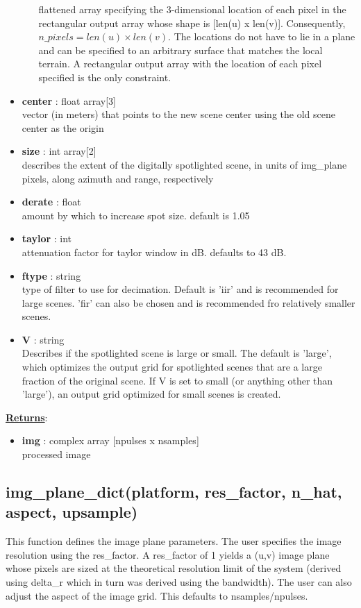 \documentclass{article}
\newcommand{\defs}[2]{\textbf{{#1}} : {#2}}
\begin{document}
\begin{itemize}
\begin{itemize}
	    	flattened array specifying the 3-dimensional location of each pixel in the rectangular output array whose shape is [len(u) x len(v)].  Consequently, $n\_pixels = len(u) \times len(v)$.  The locations do not have to lie in a plane and can be specified to an arbitrary surface that matches the local terrain.  A rectangular output array with the location of each pixel specified is the only constraint.
	\end{itemize}
	\item\defs{center}{float array[3]}\\
	vector (in meters) that points to the new scene center using the old scene center as the origin
	\item\defs{size}{int array[2]}\\
	describes the extent of the digitally spotlighted scene, in units of img\_plane pixels, along azimuth and range, respectively
	\item\defs{derate}{float}\\
	amount by which to increase spot size. default is 1.05
	\item\defs{taylor}{int}\\
	attenuation factor for taylor window in dB.  defaults to 43 dB.
	\item\defs{ftype}{string}\\
	type of filter to use for decimation.  Default is 'iir' and is recommended for large scenes.  'fir' can also be chosen and is recommended fro relatively smaller scenes.
	\item\defs{V}{string}\\
	Describes if the spotlighted scene is large or small.  The default is 'large', which optimizes the output grid for spotlighted scenes that are a large fraction of the original scene.  If V is set to small (or anything other than 'large'), an output grid optimized for small scenes is created.
\end{itemize}

\noindent \underline{\textbf{Returns}}:
\begin{itemize}
	\item \defs{img}{complex array [npulses x nsamples]}\\
	processed image
\end{itemize}

\subsection{img\_plane\_dict(platform, res\_factor, n\_hat, aspect, upsample)}
\label{sec:img_dict}
This function defines the image plane parameters.  The user specifies the image resolution using the res\_factor.  A res\_factor of 1 yields a (u,v) image plane whose pixels are sized at the theoretical resolution limit of the system (derived using delta\_r which in turn was derived using the bandwidth).  The user can also adjust the aspect of the image grid.  This defaults to nsamples/npulses.
\end{document}
